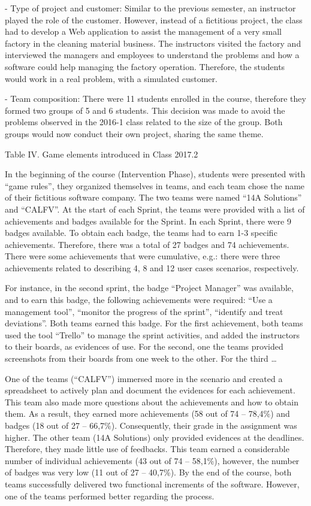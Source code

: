 -	Type of project and customer: Similar to the previous semester, an instructor played the role of the customer. However, instead of a fictitious project, the class had to develop a Web application to assist the management of a very small factory in the cleaning material business. The instructors visited the factory and interviewed the managers and employees to understand the problems and how a software could help managing the factory operation. Therefore, the students would work in a real problem, with a simulated customer.

-	Team composition: There were 11 students enrolled in the course, therefore they formed two groups of 5 and 6 students. This decision was made to avoid the problems observed in the 2016-1 class related to the size of the group. Both groups would now conduct their own project, sharing the same theme. 

Table IV. Game elements introduced in Class 2017.2

In the beginning of the course (Intervention Phase), students were presented with “game rules”, they organized themselves in teams, and each team chose the name of their fictitious software company. The two teams were named “14A Solutions” and “CALFV”. At the start of each Sprint, the teams were provided with a list of achievements and badges available for the Sprint. In each Sprint, there were 9 badges available. To obtain each badge, the teams had to earn 1-3 specific achievements. Therefore, there was a total of 27 badges and 74 achievements. There were some achievements that were cumulative, e.g.: there were three achievements related to describing 4, 8 and 12 user cases scenarios, respectively.

For instance, in the second sprint, the badge “Project Manager” was available, and to earn this badge, the following achievements were required: “Use a management tool”, “monitor the progress of the sprint”, “identify and treat deviations”. Both teams earned this badge. For the first achievement, both teams used the tool “Trello” to manage the sprint activities, and added the instructors to their boards, as evidences of use.  For the second, one the teams provided screenshots from their boards from one week to the other. For the third …

One of the teams (“CALFV”) immersed more in the scenario and created a spreadsheet to actively plan and document the evidences for each achievement. This team also made more questions about the achievements and how to obtain them. As a result, they earned more achievements (58 out of 74 – 78,4\%) and badges (18 out of 27 – 66,7\%). Consequently, their grade in the assignment was higher. The other team (14A Solutions) only provided evidences at the deadlines. Therefore, they made little use of feedbacks. This team earned a considerable number of individual achievements (43 out of 74 – 58,1\%), however, the number of badges was very low (11 out of 27 – 40,7\%). By the end of the course, both teams successfully delivered two functional increments of the software. However, one of the teams performed better regarding the process.

